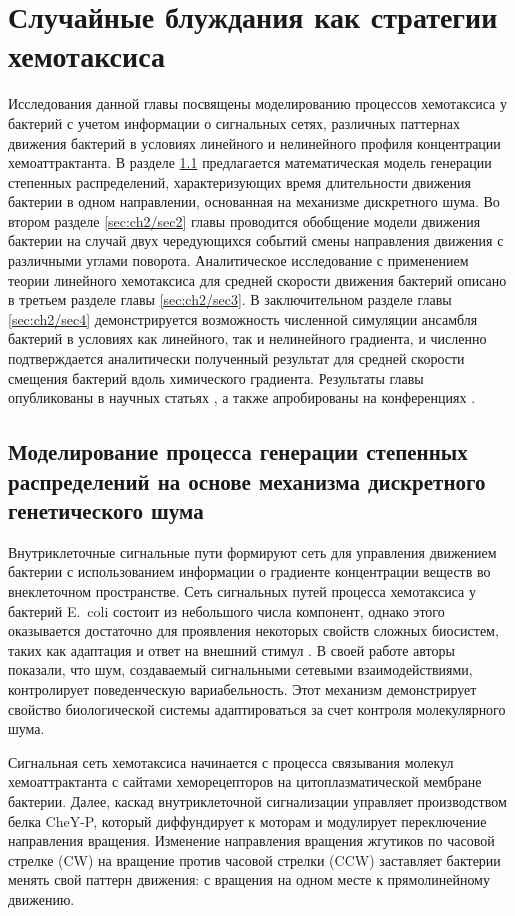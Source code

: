 \chapter{Случайные блуждания как стратегии хемотаксиса}\label{ch:ch2}

Исследования данной главы посвящены моделированию процессов хемотаксиса у бактерий с учетом информации о сигнальных сетях, различных паттернах движения бактерий в условиях линейного и нелинейного профиля концентрации хемоаттрактанта. В разделе \cref{sec:ch2/sec1} предлагается математическая модель генерации степенных распределений, характеризующих время длительности движения бактерии в одном направлении, основанная на механизме дискретного шума. Во втором разделе \cref{sec:ch2/sec2} главы проводится обобщение модели движения бактерии на случай двух чередующихся событий смены направления движения с различными углами поворота. Аналитическое исследование с применением теории линейного хемотаксиса для средней скорости движения бактерий описано в третьем разделе главы \cref{sec:ch2/sec3}. В заключительном разделе главы \cref{sec:ch2/sec4} демонстрируется возможность численной симуляции ансамбля бактерий в условиях как линейного, так и нелинейного градиента, и численно подтверждается аналитически полученный результат для средней скорости смещения бактерий вдоль химического градиента. Результаты главы опубликованы в научных статьях \cite{bib1,bib2}, а также апробированы на конференциях \cite{confbib5,confbib6}.  

\section{Моделирование процесса генерации степенных распределений на основе механизма дискретного генетического шума}\label{sec:ch2/sec1}
Внутриклеточные сигнальные пути формируют сеть для управления движением бактерии с использованием информации о градиенте концентрации веществ во внеклеточном пространстве. Сеть сигнальных путей процесса хемотаксиса у бактерий E.~coli состоит из небольшого числа компонент, однако этого оказывается достаточно для проявления некоторых свойств сложных биосистем, таких как адаптация и ответ на внешний стимул \cite{korobkova_molecular_2004}. В своей работе авторы показали, что шум, создаваемый сигнальными сетевыми взаимодействиями, контролирует поведенческую вариабельность. Этот механизм демонстрирует свойство биологической системы адаптироваться за счет контроля молекулярного шума. 

Сигнальная сеть хемотаксиса начинается с процесса связывания молекул хемоаттрактанта с сайтами хеморецепторов на цитоплазматической мембране бактерии. Далее, каскад внутриклеточной сигнализации управляет производством белка CheY-P, который диффундирует к моторам и модулирует переключение направления вращения. Изменение направления вращения жгутиков по часовой стрелке (CW) на вращение против часовой стрелки (CCW) заставляет бактерии менять свой паттерн движения: с вращения на одном месте к прямолинейному движению.

